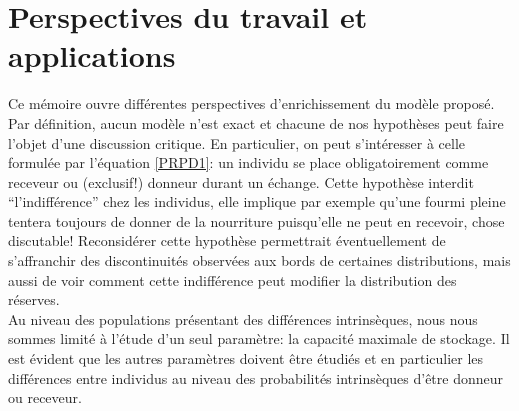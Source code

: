 %


\section{Perspectives du travail et applications}

Ce mémoire ouvre différentes perspectives d'enrichissement du modèle proposé. Par définition, aucun modèle n'est exact et chacune de nos hypothèses peut faire l'objet d'une discussion critique. En particulier, on peut s'intéresser à celle formulée par l'équation \ref{PRPD1}: un individu se place obligatoirement comme receveur ou (exclusif!) donneur durant un échange. Cette hypothèse interdit ``l'indifférence'' chez les individus, elle implique par exemple qu'une fourmi pleine tentera toujours de donner de la nourriture puisqu'elle ne peut en recevoir, chose discutable! Reconsidérer cette hypothèse permettrait éventuellement de s'affranchir des discontinuités observées aux bords de certaines distributions, mais aussi de voir comment cette indifférence peut modifier la distribution des réserves.\\

Au niveau des populations présentant des différences intrinsèques, nous nous sommes limité à l'étude d'un seul paramètre: la capacité maximale de stockage. Il est évident que les autres paramètres doivent être étudiés et en particulier les différences entre individus au niveau des probabilités intrinsèques d'être donneur ou receveur.\\

